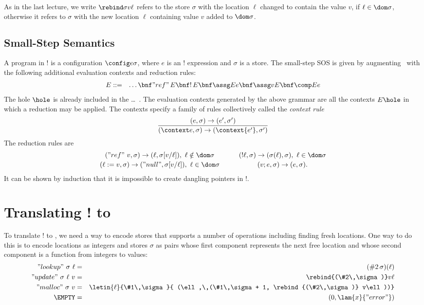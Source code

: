 As in the last lecture, we write $\rebind\sigma v\ell$ refers to the
store $\sigma$ with the location $\ell$ changed to contain the value
$v$, if $\ell\in\dom\sigma$, otherwise it refers to $\sigma$ with the
new location $\ell$ containing value $v$ added to $\dom\sigma$.

\subsection{Small-Step Semantics}

A program in \FL! is a configuration $\config e\sigma$, where $e$ is an \FL! expression and $\sigma$ is a store.  The small-step SOS is given by augmenting \FL\ with the following additional evaluation contexts and reduction rules:
\begin{eqnarray*}
E & ::= & \ldots \bnf "ref"\,E \bnf !\,E \bnf \assg Ee \bnf \assg vE \bnf \comp Ee
\end{eqnarray*}
The hole $\hole$ is already included in the \ldots~.  The evaluation contexts generated by the above grammar are all the contexts $E\hole$ in which a reduction may be applied.  The contexts specify a family of rules collectively called the \emph{context rule}
\[
\frac{\p e\sigma \rightarrow \p{e'}{\sigma'}}{\p{\context e}\sigma \rightarrow \p{\context{e'}}{\sigma'}}
\]
The reduction rules are
\[
\begin{array}{c@{\hspace{1cm}}c}
\p{"ref"~v}\sigma \rightarrow \p\ell{\sigma[v/\ell]},\ \ell\notin\dom\sigma &
\p{!\ell}\sigma \rightarrow \p{\sigma(\ell)}\sigma,\ \ell\in\dom\sigma\\[2pt]
\p{\ell := v}\sigma \rightarrow \p{"null"}{\sigma[v/\ell]},\ \ell\in\dom\sigma &
\p{v;e}\sigma \rightarrow \p e\sigma.
\end{array}
\]
It can be shown by induction that it is impossible to create dangling pointers in \FL!.

\section{Translating \FL! to \FL}

To translate \FL! to \FL, we need a way to encode stores that supports
a number of operations including finding fresh locations. One way to
do this is to encode locations as integers and stores $\sigma$ as
pairs whose first component represents the next free location and
whose second component is a function from integers to values:
\begin{eqnarray*}
"lookup"~\sigma~\ell &=& (\#2\,\sigma)(\ell)\\
"update"\ \sigma\ \ell\ v &=& \rebind{(\#2\,\sigma)} v\ell\\
"malloc"\ \sigma\ v &=& \letin{\ell}{\#1\,\sigma}{
(\ell,\,(\#1\,\sigma + 1, \rebind{(\#2\,\sigma)} v\ell))}\\
\EMPTY &=& (0, \lam{x}{"error"})\\
\end{eqnarray*}

